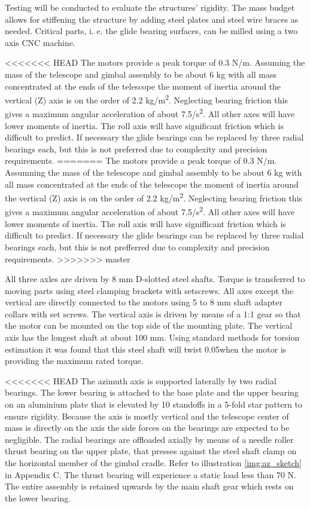 Testing will be conducted to evaluate the structures' rigidity. The mass budget allows for stiffening the structure by adding steel plates and steel wire braces as needed. Critical parts, i. e. the glide bearing surfaces, can be milled using a two axis CNC machine.

<<<<<<< HEAD
The motors provide a peak torque of 0.3 N/m. Assuming the mass of the telescope and gimbal assembly to be about 6 kg with all mass concentrated at the ends of the telescope the moment of inertia around the vertical (Z) axis is on the order of 2.2 kg/m\textsuperscript{2}. Neglecting bearing friction this gives a maximum angular acceleration of about 7.5\textdegree/s\textsuperscript{2}. All other axes will have lower moments of inertia. The roll axis will have significant friction which is difficult to predict. If necessary the glide bearings can be replaced by three radial bearings each, but this is not preferred due to complexity and precision requirements. 
=======
The motors provide a peak torque of 0.3 N/m. Assumning the mass of the telescope and gimbal assembly to be about 6 kg with all mass concentrated at the ends of the telescope the moment of inertia around the vertical (Z) axis is on the order of 2.2 kg/m\textsuperscript{2}. Neglecting bearing friction this gives a maximum angular acceleration of about 7.5\textdegree/s\textsuperscript{2}. All other axes will have lower moments of inertia. The roll axis will have signifficant friction which is difficult to predict. If necessary the glide bearings can be replaced by three radial bearings each, but this is not prefferred due to complexity and precision requirements.
>>>>>>> master

All three axles are driven by 8 mm D-slotted steel shafts. Torque is transferred to moving parts using steel clamping brackets with setscrews. All axes except the vertical are directly connected to the motors using 5 to 8 mm shaft adapter collars with set screws. The vertical axis is driven by means of a 1:1 gear so that the motor can be mounted on the top side of the mounting plate. The vertical axis has the longest shaft at about 100 mm. Using standard methods for torsion estimation it was found that this steel shaft will twist 0.05\textdegree when the motor is providing the maximum rated torque.

<<<<<<< HEAD
The azimuth axis is supported laterally by two radial bearings. The lower bearing is attached to the base plate and the upper bearing on an aluminium plate that is elevated by 10 standoffs in a 5-fold star pattern to ensure rigidity. Because the axis is mostly vertical and the telescope center of mass is directly on the axis the side forces on the bearings are expected to be negligible. The radial bearings are offloaded axially by means of a needle roller thrust bearing on the upper plate, that presses against the steel shaft clamp on the horizontal member of the gimbal cradle. Refer to illustration \ref{img:az_sketch} in Appendix C. The thrust bearing will experience a static load less than 70 N. The entire assembly is retained upwards by the main shaft gear which rests on the lower bearing. 

